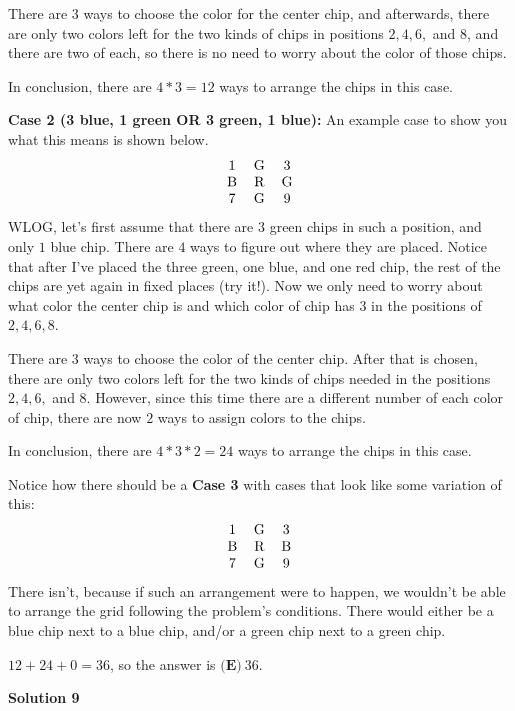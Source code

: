 \begin{enumerate}
 There are 3 ways to choose the color for the center chip, and afterwards, there are only two colors left for the two kinds of chips in positions $2, 4, 6,$ and $8$, and there are two of each, so there is no need to worry about the color of those chips.

 In conclusion, there are $4*3 = 12$ ways to arrange the chips in this case.

 \textbf{Case 2 (3 blue, 1 green OR 3 green, 1 blue):} An example case to show you what this means is shown below.
 \[\begin{tabular}{ c c c }  1 & G & 3 \\   B & R & G \\    7 & G & 9     \end{tabular}\]WLOG, let's first assume that there are $3$ green chips in such a position, and only $1$ blue chip. There are $4$ ways to figure out where they are placed. Notice that after I've placed the three green, one blue, and one red chip, the rest of the chips are yet again in fixed places (try it!). Now we only need to worry about what color the center chip is and which color of chip has $3$ in the positions of $2, 4, 6, 8$.

 There are $3$ ways to choose the color of the center chip. After that is chosen, there are only two colors left for the two kinds of chips needed in the positions $2, 4, 6,$ and $8$. However, since this time there are a different number of each color of chip, there are now $2$ ways to assign colors to the chips.

 In conclusion, there are $4*3*2 = 24$ ways to arrange the chips in this case.

 Notice how there should be a \textbf{Case 3} with cases that look like some variation of this:
 \[\begin{tabular}{ c c c }  1 & G & 3 \\   B & R & B \\    7 & G & 9     \end{tabular}\]There isn't, because if such an arrangement were to happen, we wouldn't be able to arrange the grid following the problem's conditions. There would either be a blue chip next to a blue chip, and/or a green chip next to a green chip.

 $12+24+0 = 36$, so the answer is $\boxed{\textbf{(E)} ~36}$.

 



\textbf{Solution 9}


\end{enumerate}
